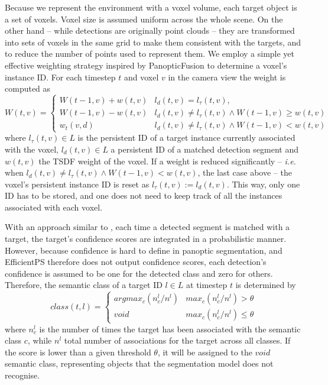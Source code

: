Because we represent the environment with a voxel volume, each target object is a set of voxels. Voxel size is assumed uniform across the whole scene. On the other hand -- while detections are originally point clouds -- they are transformed into sets of voxels in the same grid to make them consistent with the targets, and to reduce the number of points used to represent them. We employ a simple yet effective weighting strategy inspired by PanopticFusion \cite{panopticfusion} to determine a voxel's instance ID. For each timestep $t$ and voxel $v$ in the camera view the weight is computed as
\begin{equation}
W(t,v) =
    \begin{cases}
       W(t-1,v) + w(t, v) & l_d(t, v) = l_\tau(t, v), \\
       W(t-1,v) - w(t, v) & l_d(t, v) \neq l_\tau(t, v) \land W(t-1,v) \geq w(t, v) \\
       w_t(v, d) & l_d(t, v) \neq l_\tau(t, v) \land W(t-1,v) < w(t, v) 
    \end{cases}
\end{equation}
where $l_\tau(t, v) \in L$ is the persistent ID of a target instance currently associated with the voxel, $l_d(t, v) \in L$ a persistent ID of a matched detection segment and $w(t, v)$ the TSDF weight of the voxel. If a weight is reduced significantly -- \textit{i.e.} when $l_d(t, v) \neq l_\tau(t, v) \land W(t-1,v) < w(t, v)$, the last case above -- the voxel's persistent instance ID is reset as $l_\tau(t, v) := l_d(t, v)$. This way, only one ID has to be stored, and one does not need to keep track of all the instances associated with each voxel.

With an approach similar to \cite{panopticfusion}, each time a detected segment is matched with a target, the target's confidence scores are integrated in a probabilistic manner. However, because confidence is hard to define in panoptic segmentation, and EfficientPS therefore does not output confidence scores, each detection's confidence is assumed to be one for the detected class and zero for others. Therefore, the semantic class of a target ID $l \in L$ at timestep $t$ is determined by
\begin{equation}
    class(t,l) = 
    \begin{cases}
        argmax_c(n_c^l / n^l) & max_c(n_c^l / n^l) > \theta \\
        void                  & max_c(n_c^l / n^l) \leq \theta
    \end{cases}
\end{equation}
where $n_c^l$ is the number of times the target has been associated with the semantic class $c$, while $n^l$ total number of associations for the target across all classes. If the score is lower than a given threshold $\theta$, it will be assigned to the $void$ semantic class, representing objects that the segmentation model does not recognise.

